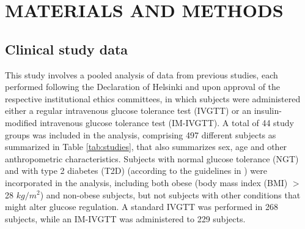 \documentclass[utf8]{frontiersSCNS} %
\begin{document}
\vskip 0.5cm
\section{MATERIALS AND METHODS}
\vskip 0.5cm
\subsection{Clinical study data}
This study involves a pooled analysis of data from previous studies, each performed following the Declaration of Helsinki and upon approval of the respective institutional ethics committees, in which subjects were administered either a regular intravenous glucose tolerance test (IVGTT) or an insulin-modified intravenous glucose tolerance test (IM-IVGTT). A total of 44 study groups was included in the analysis, comprising 497 different subjects as summarized in Table \ref{tab:studies}, that also summarizes sex, age and other anthropometric characteristics. Subjects with normal glucose tolerance (NGT) and with type 2 diabetes (T2D) (according to the guidelines in \citet{Diabetes_Care}) were incorporated in the analysis, including both obese (body mass index (BMI) $>$ 28 $kg/m^2$) and non-obese subjects, but not subjects with other conditions that might alter glucose regulation. A standard IVGTT was performed in 268 subjects, while an IM-IVGTT was administered to 229 subjects. 
\end{document}
